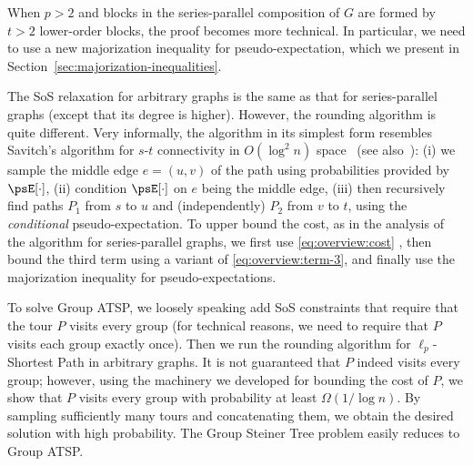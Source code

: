 \documentclass[11pt,a4paper]{article}
\begin{document}
When $p > 2$ and blocks in the series-parallel composition of $G$ are formed by $t > 2$ lower-order blocks, the proof becomes more technical. In particular, we need to use a new majorization inequality for pseudo-expectation, which we present in Section~\ref{sec:majorization-inequalities}. 

The SoS relaxation for arbitrary graphs is the same as that for series-parallel graphs (except that its degree is higher). However, the rounding algorithm is quite different. Very informally, the algorithm in its simplest form resembles Savitch's algorithm for $s$-$t$ connectivity in $O(\log^2 n)$ space~\cite{savitch1970} (see also~\cite{chekuri2005recursive}): (i) we sample the middle edge $e = (u,v)$ of the path using probabilities provided by $\psE[\cdot]$, (ii) condition $\psE[\cdot]$ on $e$ being the middle edge, (iii) then recursively find paths $P_1$ from $s$ to $u$ and (independently) $P_2$ from $v$ to $t$, using the \textit{conditional} pseudo-expectation. To upper bound the cost, as in the analysis of the algorithm for series-parallel graphs, we first use \eqref{eq:overview:cost} , then bound the third term using a variant of \eqref{eq:overview:term-3},  and finally use the majorization inequality for pseudo-expectations.

To solve Group ATSP, we loosely speaking add SoS constraints that require that the tour $P$ visits every group (for technical reasons, we need to require that $P$ visits each group exactly once).  Then we run the rounding algorithm for $\ell_p$-Shortest Path in arbitrary graphs. It is not guaranteed that $P$ indeed visits every group; however, using the machinery we developed for bounding the cost of $P$, we show that $P$ visits every group with probability at least $\Omega(1/\log n)$. By sampling sufficiently many tours and concatenating them, we obtain the desired solution with high probability.  The Group Steiner Tree problem easily reduces to Group ATSP.
\end{document}
